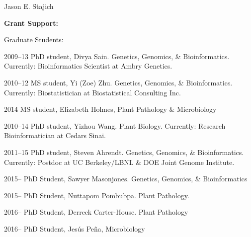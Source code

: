 \documentclass[10pt]{article}
\begin{document}
\begin{cv}{\centerline{Jason E. Stajich}}
\begin{cvlistcompact}{\bf Grant Support:}

\begin{cvlistcompact}{Graduate Students:}
\item [2009--13] PhD student, Divya Sain. Genetics, Genomics, \&
  Bioinformatics. Currently: Bioinformatics Scientist at Ambry Genetics.
\item [2010--12] MS student, Yi (Zoe) Zhu. Genetics, Genomics, \&
  Bioinformatics. Currently: Biostatistician at Biostatistical Consulting Inc.
\item [2014] MS student, Elizabeth Holmes, Plant Pathology \& Microbiology
\item [2010--14] PhD student, Yizhou Wang. Plant Biology. Currently:
  Research Bioinformatician at Cedars Sinai.
\item [2011--15] PhD student, Steven Ahrendt. Genetics, Genomics, \&
  Bioinformatics. Currently: Postdoc at UC Berkeley/LBNL \& DOE Joint
  Genome Institute.
\item [2015--] PhD Student, Sawyer Masonjones. Genetics, Genomics, \&
  Bioinformatics
\item [2015--] PhD Student, Nuttapom Pombubpa. Plant Pathology.
\item [2016--] PhD Student, Derreck Carter-House. Plant Pathology
\item [2016--] PhD Student, Jes\'{u}s Pe\~{n}a, Microbiology
\end{cvlistcompact}


\end{cvlistcompact}
\end{cv}
\end{document}
